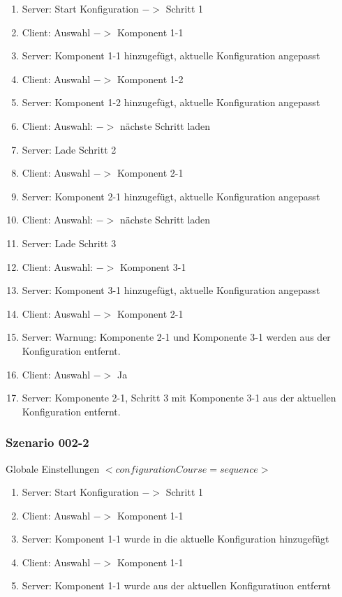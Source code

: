 \documentclass{article}
\begin{document}
\begin{enumerate}
  \item Server: Start Konfiguration $->$ Schritt 1
  \item Client: Auswahl $->$ Komponent 1-1
  \item Server: Komponent 1-1 hinzugef\"ugt, aktuelle Konfiguration angepasst
  \item Client: Auswahl $->$ Komponent 1-2
  \item Server: Komponent 1-2 hinzugef\"ugt, aktuelle Konfiguration angepasst
  \item Client: Auswahl: $->$ n\"achste Schritt laden
  \item Server: Lade Schritt 2
  \item Client: Auswahl $->$ Komponent 2-1
  \item Server: Komponent 2-1 hinzugef\"ugt, aktuelle Konfiguration angepasst
  \item Client: Auswahl: $->$ n\"achste Schritt laden
  \item Server: Lade Schritt 3
  \item Client: Auswahl: $->$ Komponent 3-1
  \item Server: Komponent 3-1 hinzugef\"ugt, aktuelle Konfiguration angepasst
  \item Client: Auswahl $->$ Komponent 2-1
  \item Server: Warnung: Komponente 2-1 und Komponente 3-1 werden aus der
  Konfiguration entfernt.
  \item Client: Auswahl $->$ Ja
  \item Server: Komponente 2-1, Schritt 3 mit Komponente 3-1 aus der aktuellen
  Konfiguration entfernt.
\end{enumerate}

\subsubsection{Szenario 002-2}

Globale Einstellungen $<configurationCourse=sequence>$

\begin{enumerate}
  \item Server: Start Konfiguration $->$ Schritt 1
  \item Client: Auswahl $->$ Komponent 1-1
  \item Server: Komponent 1-1 wurde in die aktuelle Konfiguration hinzugef\"ugt
  \item Client: Auswahl $->$ Komponent 1-1
  \item Server: Komponent 1-1 wurde aus der aktuellen Konfiguratiuon entfernt
\end{enumerate}
\end{document}
